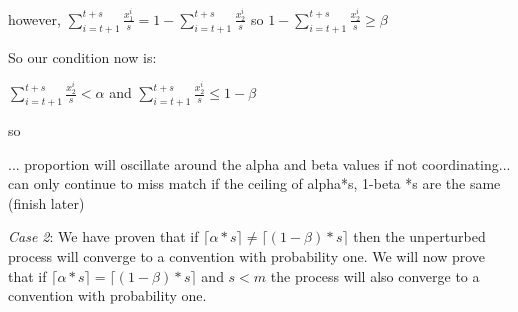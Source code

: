 \documentclass{article}
\begin{document}
however, 
$\sum\limits_{i=t+1}^{t+s} \frac{x_1^i}{s}=1-\sum\limits_{i=t+1}^{t+s} \frac{x_2^i}{s}$ 
so
$1-\sum\limits_{i=t+1}^{t+s} \frac{x_2^i}{s} \geq \beta$

So our condition now is:

$\sum\limits_{i=t+1}^{t+s} \frac{x^i_2}{s} < \alpha$
and
$\sum\limits_{i=t+1}^{t+s} \frac{x^i_2}{s} \leq 1-\beta$

so

... proportion will oscillate around the alpha and beta values if not coordinating... can only continue to miss match if the ceiling of alpha*s, 1-beta *s are the same (finish later)

\vskip20pt

\textit{Case 2}: We have proven that if $\lceil \alpha*s \rceil \neq \lceil (1-\beta)*s \rceil$ then the unperturbed process will converge to a convention with probability one. We will now prove that if $\lceil \alpha*s \rceil = \lceil (1-\beta)*s \rceil$ and $s<m$ the process will also converge to a convention with probability one.
\end{document}
